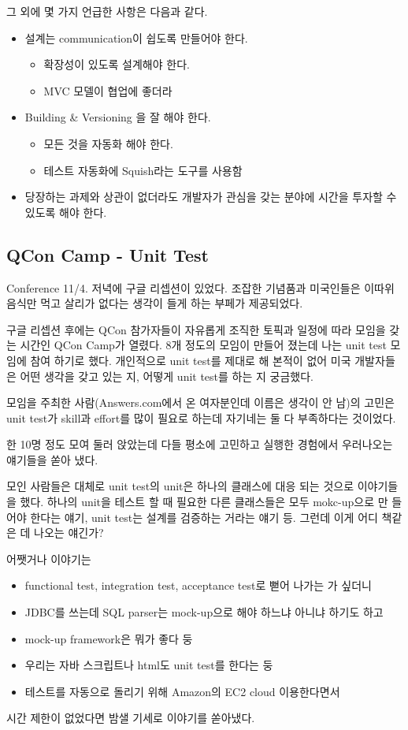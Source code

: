 \documentclass[11pt]{article}
\begin{document}
그 외에 몇 가지 언급한 사항은 다음과 같다.
\begin{itemize}
\item 설계는 communication이 쉽도록 만들어야 한다.
    \begin{itemize}
    \item 확장성이 있도록 설계해야 한다.
    \item MVC 모델이 협업에 좋더라
    \end{itemize}
\item Building \& Versioning 을 잘 해야 한다.
    \begin{itemize}
    \item 모든 것을 자동화 해야 한다.
    \item 테스트 자동화에 Squish라는 도구를 사용함
    \end{itemize}
\item 당장하는 과제와 상관이 없더라도 개발자가 관심을 갖는 분야에 시간을 투자할 수 있도록 해야 한다.
\end{itemize}
 
\subsection{QCon Camp - Unit Test}

Conference 11/4. 저녁에 구글 리셉션이 있었다. 조잡한 기념품과 미국인들은
이따위 음식만 먹고 살리가 없다는 생각이 들게 하는 부페가 제공되었다.
 
구글 리셉션 후에는 QCon 참가자들이 자유롭게 조직한 토픽과 일정에 따라
모임을 갖는 시간인 QCon Camp가 열렸다. 8개 정도의 모임이 만들어 졌는데
나는 unit test 모임에 참여 하기로 했다.
개인적으로 unit test를 제대로 해 본적이 없어 미국 개발자들은 어떤
생각을 갖고 있는 지, 어떻게 unit test를 하는 지 궁금했다.

모임을 주최한 사람(Answers.com에서 온 여자분인데 이름은 생각이 안 남)의 
고민은 unit test가 skill과 effort를 많이 필요로 하는데 자기네는 둘 다 
부족하다는 것이었다.

한 10명 정도 모여 둘러 앉았는데 다들 평소에 고민하고 실행한 경험에서
우러나오는 얘기들을 쏟아 냈다.
 
모인 사람들은 대체로 unit test의 unit은 하나의
클래스에 대응 되는 것으로 이야기들을 했다. 하나의 unit을 테스트 할 때
필요한 다른 클래스들은 모두 mokc-up으로 만 들어야 한다는 얘기, unit
test는 설계를 검증하는 거라는 얘기 등. 
그런데 이게 어디 책같은 데 나오는 얘긴가?
 
어쨋거나 이야기는 
\begin{itemize}
\item functional test, integration test, acceptance test로 뻗어 나가는 
가 싶더니 
\item JDBC를 쓰는데 SQL parser는  mock-up으로 해야 하느냐 아니냐 하기도 하고 
\item mock-up framework은 뭐가 좋다 둥 
\item 우리는 자바 스크립트나 html도 unit test를 한다는 둥
\item 테스트를 자동으로 돌리기 위해 Amazon의 EC2 cloud 이용한다면서 
\end{itemize}
시간 제한이 없었다면 밤샐 기세로 이야기를 쏟아냈다. 
\end{document}
